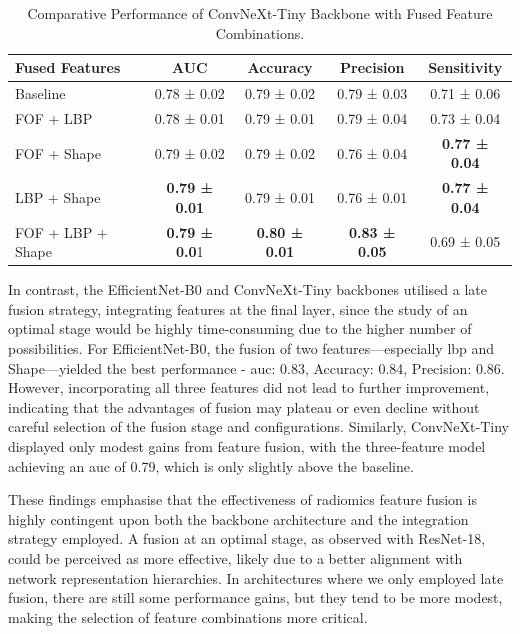 \begin{table}[htb]
  \centering
  \caption{Comparative Performance of ConvNeXt-Tiny Backbone with Fused Feature Combinations.}
  \label{tab:convnext_tiny_fusion_metrics}
  \begin{tabular}{@{} l  c  c  c  c @{}}
    \toprule
    \textbf{Fused Features} 
      & \textbf{AUC} 
      & \textbf{Accuracy} 
      & \textbf{Precision} 
      & \textbf{Sensitivity} \\
    \midrule
    Baseline                & 0.78 ± 0.02 & 0.79 ± 0.02 & 0.79 ± 0.03 & 0.71 ± 0.06\\
    \hline \addlinespace
    FOF + LBP               & 0.78 ± 0.01 & 0.79 ± 0.01 & 0.79 ± 0.04 & 0.73 ± 0.04 \\
    FOF + Shape             & 0.79 ± 0.02 & 0.79 ± 0.02	& 0.76 ± 0.04 &\textbf{ 0.77 ± 0.04} \\
    LBP + Shape             & \textbf{0.79 ± 0.01} & 0.79 ± 0.01	& 0.76 ± 0.01 & \textbf{0.77 ± 0.04} \\
    \hline \addlinespace
    FOF + LBP + Shape       & \textbf{0.79 ± 0.0}1 & \textbf{0.80 ± 0.01} & \textbf{0.83 ± 0.05} & 0.69 ± 0.05 \\
    \bottomrule
  \end{tabular}
\end{table}

In contrast, the EfficientNet-B0 and ConvNeXt-Tiny backbones utilised a late fusion strategy, integrating features at the final layer, since the study of an optimal stage would be highly time-consuming due to the higher number of possibilities. For EfficientNet-B0, the fusion of two features—especially \ac{lbp} and Shape—yielded the best performance - \ac{auc}: 0.83, Accuracy: 0.84, Precision: 0.86. However, incorporating all three features did not lead to further improvement, indicating that the advantages of fusion may plateau or even decline without careful selection of the fusion stage and configurations. Similarly, ConvNeXt-Tiny displayed only modest gains from feature fusion, with the three-feature model achieving an \ac{auc} of 0.79, which is only slightly above the baseline.

These findings emphasise that the effectiveness of radiomics feature fusion is highly contingent upon both the backbone architecture and the integration strategy employed. A fusion at an optimal stage, as observed with ResNet-18, could be perceived as more effective, likely due to a better alignment with network representation hierarchies. In architectures where we only employed late fusion, there are still some performance gains, but they tend to be more modest, making the selection of feature combinations more critical.



